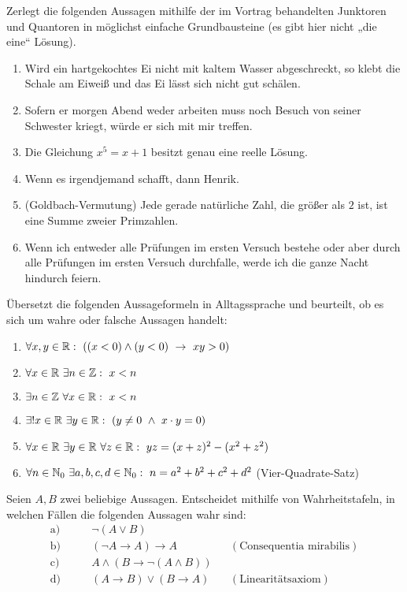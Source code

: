 \begin{aufg}
    Zerlegt die folgenden Aussagen mithilfe der im Vortrag behandelten Junktoren und Quantoren in möglichst einfache Grundbausteine (es gibt hier nicht „die eine“ Lösung).
    \begin{enumerate}
        \item Wird ein hartgekochtes Ei nicht mit kaltem Wasser abgeschreckt, so klebt die Schale am Eiweiß und das Ei lässt sich nicht gut schälen.
        \item Sofern er morgen Abend weder arbeiten muss noch Besuch von seiner Schwester kriegt, würde er sich mit mir treffen.
        \item Die Gleichung $x^5=x+1$ besitzt genau eine reelle Lösung.
        \item Wenn es irgendjemand schafft, dann Henrik.
        \item(Goldbach-Vermutung) Jede gerade natürliche Zahl, die größer als $2$ ist, ist eine Summe zweier Primzahlen.
        \item Wenn ich entweder alle Prüfungen im ersten Versuch bestehe oder aber durch alle Prüfungen im ersten Versuch durchfalle, werde ich die ganze Nacht hindurch feiern.
    \end{enumerate}
\end{aufg}


\begin{aufg}
    Übersetzt die folgenden Aussageformeln in Alltagssprache und beurteilt, ob es sich um wahre oder falsche Aussagen handelt:
    \begin{enumerate}
        \item $\forall x,y\in \mathbb R:\ ((x<0)\land (y<0)\ \to\ xy>0)$
        \item $\forall x\in \R\ \exists n\in \Z:\ x<n$
        \item $\exists n\in \Z\ \forall x\in \R:\ x<n$
        \item $\exists! x\in \R\ \exists y\in \R:\ (y\neq0\ \land\ x\cdot y=0)$
        \item $\forall x\in \R\ \exists y\in \R\ \forall z\in \R:\ yz = (x+z)^2-(x^2+z^2)$
        \item $\forall n\in\mathbb N_0\ \exists a,b,c,d\in \mathbb N_0:\ n=a^2+b^2+c^2+d^2$ \quad (Vier-Quadrate-Satz)
    \end{enumerate}
\end{aufg}
	
	
\begin{aufg}[Wahrheitstafeln]
    Seien $A,B$ zwei beliebige Aussagen. Entscheidet mithilfe von Wahrheitstafeln, in welchen Fällen die folgenden Aussagen wahr sind:
    \begin{align*}
        \text{a)}&\qquad \neg(A\lor B) \\
        \text{b)}&\qquad (\neg A \to A) \to A && (\text{Consequentia mirabilis}) \\
        \text{c)}&\qquad A\land(B\to\neg(A\land B)) \\
        \text{d)}&\qquad (A\to B)\lor(B\to A) && (\text{Linearitätsaxiom})
    \end{align*}
\end{aufg}


